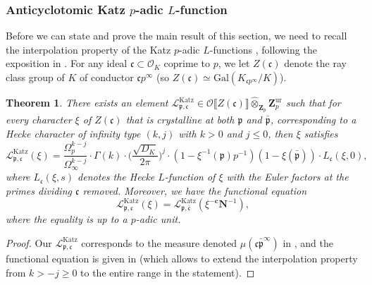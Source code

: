 \documentclass[10pt,letterpaper]{amsart}
\theoremstyle{plain}
\newtheorem{thm}{Theorem}[subsection] %
\theoremstyle{definition}
\theoremstyle{definition}
\theoremstyle{plain}
\theoremstyle{plain}
\theoremstyle{plain}
\theoremstyle{remark}
\numberwithin{equation}{section}
\newcommand{\cc}{\mathbf{c}}
\newcommand{\pp}{\mathfrak{p}}
\newcommand{\ppbar}{\bar{\mathfrak{p}}}
\DeclareMathOperator{\ur}{\mathrm{ur}}
\def\cO{\mathcal O}
\def\Lcal{\mathcal L}
\newcommand{\Z}{\mathbf{Z}}
\newcommand{\dBr}[1]{\llbracket{#1}\rrbracket}
\begin{document}
\subsubsection{Anticyclotomic Katz $p$-adic $L$-function}

Before we can state and prove the main result of this section, we need to recall the interpolation property of the Katz $p$-adic $L$-functions \cite{Katz49}, following the exposition in \cite{deshalit}. For any ideal $\mathfrak{c}\subset\cO_K$ coprime to $p$, we let $Z(\mathfrak{c})$ denote the ray class group of $K$ of conductor $\mathfrak{c}p^\infty$ (so $Z(\mathfrak{c})\simeq{\mathrm{Gal}}(K_{\mathfrak{c}p^\infty}/K)$). 

\begin{thm}\label{thm:katz}
There exists an element $\Lcal_{\pp,\mathfrak{c}}^{\mathrm{Katz}}
\in\cO\dBr{Z(\mathfrak{c})}\hat\otimes_{\Z_p}\Z_p^{\ur}$ 
such that for every character $\xi$ of $Z(\mathfrak{c})$ that is crystalline at both $\pp$ and $\ppbar$, corresponding to a Hecke character of infinity type $(k,j)$ with $k>0$ and $j\leq 0$, then $\xi$  satisfies 
\[
\Lcal_{\pp,\mathfrak{c}}^{\mathrm{Katz}}(\xi)=\frac{\Omega_p^{k-j}}{\Omega_\infty^{k-j}}\cdot\Gamma(k)\cdot\biggl(\frac{\sqrt{D_K}}{2\pi}\biggr)^j\cdot(1-\xi^{-1}(\pp)p^{-1})(1-\xi(\bar{\pp}))\cdot L_{\mathfrak{c}}(\xi,0),
\]
where $L_{\mathfrak{c}}(\xi,s)$ denotes the Hecke $L$-function of $\xi$ with the Euler factors at the primes dividing $\mathfrak{c}$ removed.  
Moreover, we have the functional equation 
\[
\Lcal_{\pp,\mathfrak{c}}^{\mathrm{Katz}}(\xi)=\Lcal_{\pp,\bar{\mathfrak{c}}}^{\mathrm{Katz}}(\xi^{-\cc}\mathbf{N}^{-1}),
\] 
where the equality is up to a $p$-adic unit.
\end{thm}

\begin{proof}
Our $\Lcal_{\pp,\mathfrak{c}}^{\mathrm{Katz}}$ corresponds to the measure denoted $\mu(\mathfrak{c}\bar{\pp}^\infty)$ in \cite[Thm.~II.4.14]{deshalit}, 
and the functional equation is given in \cite[Thm.~II.6.4]{deshalit} (which allows to extend the interpolation property from $k>-j\geq 0$ to the entire range in the statement).
\end{proof}
\end{document}
